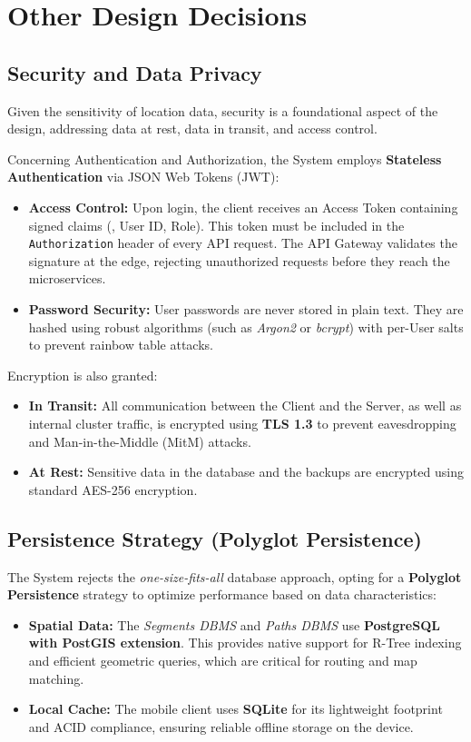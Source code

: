 \section{Other Design Decisions}

\subsection*{Security and Data Privacy}
Given the sensitivity of location data, security is a foundational aspect of the design, addressing data at rest, data in transit, and access control.

Concerning Authentication and Authorization, the System employs \textbf{Stateless Authentication} via JSON Web Tokens (JWT):
\begin{itemize}
    \item \textbf{Access Control:} Upon login, the client receives an Access Token containing signed claims (\eg, User ID, Role). This token must be included in the \texttt{Authorization} header of every API request. The API Gateway validates the signature at the edge, rejecting unauthorized requests before they reach the microservices.
    \item \textbf{Password Security:} User passwords are never stored in plain text. They are hashed using robust algorithms (such as \emph{Argon2} or \emph{bcrypt}) with per-User salts to prevent rainbow table attacks.
\end{itemize}

Encryption is also granted:
\begin{itemize}
    \item \textbf{In Transit:} All communication between the Client and the Server, as well as internal cluster traffic, is encrypted using \textbf{TLS 1.3} to prevent eavesdropping and Man-in-the-Middle (MitM) attacks.
    \item \textbf{At Rest:} Sensitive data in the database and the backups are encrypted using standard AES-256 encryption.
\end{itemize}

\subsection*{Persistence Strategy (Polyglot Persistence)}
The System rejects the \emph{one-size-fits-all} database approach, opting for a \textbf{Polyglot Persistence} strategy to optimize performance based on data characteristics:
\begin{itemize}
    \item \textbf{Spatial Data:} The \emph{Segments DBMS} and \emph{Paths DBMS} use \textbf{PostgreSQL with PostGIS extension}. This provides native support for R-Tree indexing and efficient geometric queries, which are critical for routing and map matching.
    \item \textbf{Local Cache:} The mobile client uses \textbf{SQLite} for its lightweight footprint and ACID compliance, ensuring reliable offline storage on the device.
\end{itemize}

